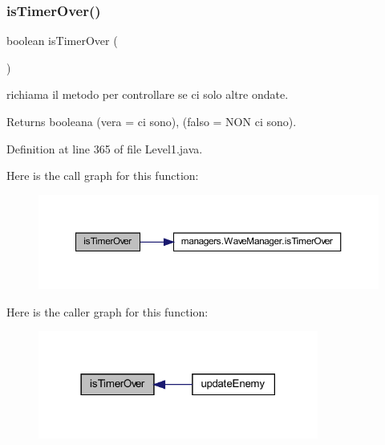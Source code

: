 \subsubsection{\texorpdfstring{is\+Timer\+Over()}{isTimerOver()}}
{\footnotesize\ttfamily boolean is\+Timer\+Over (\begin{DoxyParamCaption}{ }\end{DoxyParamCaption})\hspace{0.3cm}{\ttfamily [private]}}



richiama il metodo per controllare se ci solo altre ondate. 

\begin{DoxyReturn}{Returns}
booleana (vera = ci sono), (falso = N\+ON ci sono). 
\end{DoxyReturn}


Definition at line 365 of file Level1.\+java.

Here is the call graph for this function\+:\nopagebreak
\begin{figure}[H]
\begin{center}
\leavevmode
\includegraphics[width=350pt]{classscenes_1_1_level1_ab68417e6738c05037923f5f0f21eb586_cgraph}
\end{center}
\end{figure}
Here is the caller graph for this function\+:\nopagebreak
\begin{figure}[H]
\begin{center}
\leavevmode
\includegraphics[width=261pt]{classscenes_1_1_level1_ab68417e6738c05037923f5f0f21eb586_icgraph}
\end{center}
\end{figure}
\mbox{\label{classscenes_1_1_level1_aa12eb1084be2c4d9b03d5f248f00900d}} 
